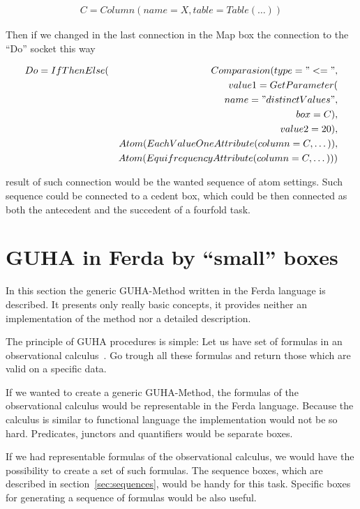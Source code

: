 \documentclass[a4paper,12pt]{book}
\begin{document}
\begin{eqnarray*}
C=Column(name=X, table=Table(\dots))
\end{eqnarray*}

Then if we changed in the last connection in the Map box the connection to the ``Do'' socket this way

\begin{eqnarray*}
Do=IfThenElse(&&Comparasion(type="<=", \\&&\qquad value1=GetParameter(\\&&\qquad\qquad name="distinctValues", \\&&\qquad\qquad box=C), \\&&\qquad value2=20),\\&&Atom(EachValueOneAttribute(column=C,\dots)),\\&&Atom(EquifrequencyAttribute(column=C,\dots)))
\end{eqnarray*}

result of such connection would be the wanted sequence of atom settings. Such sequence could be connected to a cedent box, which could be then connected as both the antecedent and the succedent of a fourfold task.

\section{GUHA in Ferda by ``small'' boxes}
In this section the generic GUHA-Method written in the Ferda language is described. It presents only really basic concepts, it provides neither an implementation of the method nor a detailed description.

The principle of GUHA procedures is simple: Let us have set of formulas in an observational calculus~\cite{GUHAbook}. Go trough all these formulas and return those which are valid on a specific data.

If we wanted to create a generic GUHA-Method, the formulas of the observational calculus would be representable in the Ferda language. Because the calculus is similar to functional language the implementation would not be so hard. Predicates, junctors and quantifiers would be separate boxes.

If we had representable formulas of the observational calculus, we would have the possibility to create a set of such formulas. The sequence boxes, which are described in section~\ref{sec:sequences}, would be handy for this task. Specific boxes for generating a sequence of formulas would be also useful.
\end{document}
